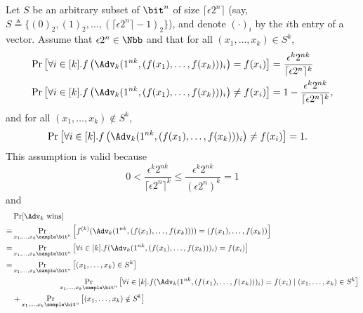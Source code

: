 \begin{answer}[i]
    Let $S$ be an arbitrary subset of $\bit^n$ of size $\lceil \epsilon 2^n\rceil$  (say, $S\triangleq \{(0)_2,(1)_2,\ldots,(\lceil \epsilon 2^n\rceil-1)_2\}$), and denote $(\cdot)_i$ by the $i$th entry of a vector.
    Assume that $\epsilon 2^n\in\Nbb$ and that for all $(x_1,\ldots,x_k)\in S^k$,
    \begin{align}
        \Pr\left[\forall i\in[k]. f\left(\Adv_k(1^{nk}, (f(x_1),\ldots,f(x_k)))_i \right) = f(x_i) \right]
        &= \frac{\epsilon^k 2^{nk}}{\lceil \epsilon 2^n\rceil^k} \label{eq:in-S-all-correct}\\
        \Pr\left[\forall i\in[k]. f\left(\Adv_k(1^{nk}, (f(x_1),\ldots,f(x_k)))_i \right) \neq f(x_i) \right]
        &= 1- \frac{\epsilon^k 2^{nk}}{\lceil \epsilon 2^n\rceil^k} \label{eq:in-S-all-wrong},
    \end{align}
    and for all  $(x_1,\ldots,x_k)\notin S^k$,
    \begin{align}
        \Pr\left[\forall i\in[k]. f\left(\Adv_k(1^{nk}, (f(x_1),\ldots,f(x_k)))_i \right) \neq f(x_i) \right]
        &= 1. \label{eq:not-in-S}
    \end{align}
    This assumption is valid because
    \[
        0\lt \frac{\epsilon^k 2^{nk}}{\lceil \epsilon 2^n\rceil^k} \le \frac{\epsilon^k 2^{nk}}{( \epsilon 2^n)^k} =1
    \]
    and
    \begin{align*}
        &\Pr[\Adv_k \textrm{ wins}]\\
        \equiv&\Pr_{x_1,\ldots,x_k\sample\bit^n}\left[ f^{(k)}(\Adv_k(1^{nk}, (f(x_1),\ldots,f(x_k)))) = (f(x_1),\ldots,f(x_k)) \right]\\
        =& \Pr_{x_1,\ldots,x_k\sample\bit^n}\left[ \forall i\in [k].f(\Adv_k(1^{nk}, (f(x_1),\ldots,f(x_k)))_i) = f(x_i) \right]\\
        =& \Pr_{x_1,\ldots,x_k\sample\bit^n}\left[ (x_1,\ldots,x_k)\in S^k \right]\\
            &\qquad\qquad\qquad \Pr_{x_1,\ldots,x_k\sample\bit^n}\left[ \forall i\in [k].f(\Adv_k(1^{nk}, (f(x_1),\ldots,f(x_k)))_i) = f(x_i) \mid (x_1,\ldots,x_k)\in S^k \right]\\
            &+ \Pr_{x_1,\ldots,x_k\sample\bit^n}\left[ (x_1,\ldots,x_k)\notin S^k \right]\\

\end{align*}
\end{answer}
